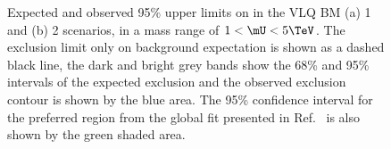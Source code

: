 \begin{figure}[!hbtp]
\centering
\caption{Expected and observed 95\% \CL upper limits on \gU in the VLQ BM (a) 1 and (b) 2 scenarios, in a mass range of $1<\mU<5\TeV$.  The exclusion limit only on background expectation is shown as a dashed black line, the dark and bright grey bands show the 68\% and 95\% intervals of the expected exclusion and the observed exclusion contour is shown by the blue area. The 95\% confidence interval for the preferred region from the global fit presented in Ref.~\cite{Cornella:2021sby} is also shown by the green shaded area.
}
\label{fig:vlq_limits}
\end{figure}


